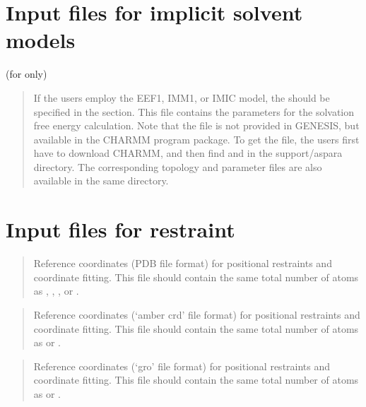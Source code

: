 \documentclass[a4paper,11pt,oneside,english]{sphinxmanual}
\begin{document}
\section{Input files for implicit solvent models}
\label{\detokenize{03_Input:input-files-for-implicit-solvent-models}}
 (for  only)
\begin{quote}

If the users employ the EEF1, IMM1, or IMIC model, the  should be specified in the \sphinxstylestrong{{[}INPUT{]}} section.
This file contains the parameters for the solvation free energy calculation.
Note that the file is not provided in GENESIS, but available in the CHARMM program package.
To get the file, the users first have to download CHARMM, and then find  and  in the support/aspara directory.
The corresponding topology and parameter files are also available in the same directory.
\end{quote}


\section{Input files for restraint}
\label{\detokenize{03_Input:input-files-for-restraint}}
\begin{quote}

Reference coordinates (PDB file format) for positional restraints and
coordinate fitting.
This file should contain the same total number of atoms as ,
, , or .
\end{quote}

\begin{quote}

Reference coordinates (‘amber crd’ file format) for positional
restraints and coordinate fitting.
This file should contain the same total number of atoms as
 or .
\end{quote}

\begin{quote}

Reference coordinates (‘gro’ file format) for positional
restraints and coordinate fitting.
This file should contain the same total number of atoms as
 or .
\end{quote}
\end{document}
